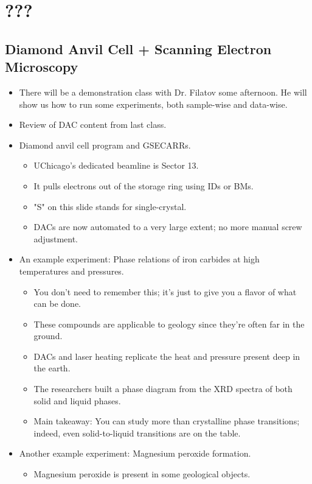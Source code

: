 \documentclass[../notes.tex]{subfiles}
\begin{document}
\chapter{???}
\section{Diamond Anvil Cell + Scanning Electron Microscopy}
\begin{itemize}
    \item {}There will be a demonstration class with Dr. Filatov some afternoon. He will show us how to run some experiments, both sample-wise and data-wise.
    \item Review of DAC content from last class.
    \item Diamond anvil cell program and GSECARRs.
    \begin{itemize}
        \item UChicago's dedicated beamline is Sector 13.
        \item It pulls electrons out of the storage ring using IDs or BMs.
        \item "S" on this slide stands for single-crystal.
        \item DACs are now automated to a very large extent; no more manual screw adjustment.
    \end{itemize}
    \item An example experiment: Phase relations of iron carbides at high temperatures and pressures.
    \begin{itemize}
        \item You don't need to remember this; it's just to give you a flavor of what can be done.
        \item These compounds are applicable to geology since they're often far in the ground.
        \item DACs and laser heating replicate the heat and pressure present deep in the earth.
        \item The researchers built a phase diagram from the XRD spectra of both solid and liquid phases.
        \item Main takeaway: You can study more than crystalline phase transitions; indeed, even solid-to-liquid transitions are on the table.
    \end{itemize}
    \item Another example experiment: Magnesium peroxide formation.
    \begin{itemize}
        \item Magnesium peroxide is present in some geological objects.

\end{itemize}
\end{itemize}
\end{document}
